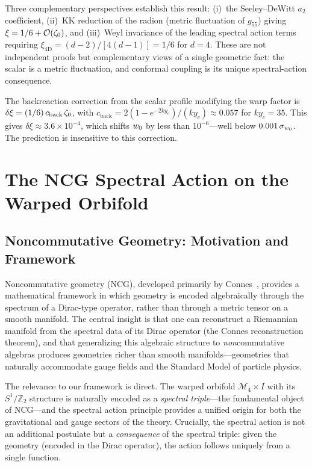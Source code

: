 Three complementary perspectives establish this result: (i)~the Seeley--DeWitt $a_2$ coefficient, (ii)~KK reduction of the radion (metric fluctuation of $g_{55}$) giving $\xi = 1/6 + \mathcal{O}\!\left(\zeta_0\right)$, and (iii)~Weyl invariance of the leading spectral action terms requiring $\xi_{4\mathrm{D}} = (d-2)/[4(d-1)] = 1/6$ for $d = 4$. These are not independent proofs but complementary views of a single geometric fact: the scalar is a metric fluctuation, and conformal coupling is its unique spectral-action consequence.

The backreaction correction from the scalar profile modifying the warp factor is $\delta\xi = (1/6)\, c_{\mathrm{back}}\,\zeta_0$, with $c_{\mathrm{back}} = 2(1 - e^{-2ky_c})/(ky_c) \approx 0.057$ for $ky_c = 35$. This gives $\delta\xi \approx 3.6 \times 10^{-4}$, which shifts $w_0$ by less than $10^{-6}$---well below $0.001\,\sigma_{w_0}$. The prediction is insensitive to this correction.


\section{The NCG Spectral Action on the Warped Orbifold}
\label{sec:1-ncg}

\subsection{Noncommutative Geometry: Motivation and Framework}
\label{sec:1-ncg-motivation}

Noncommutative geometry (NCG), developed primarily by Connes~\cite{ch1:connes94}, provides a mathematical framework in which geometry is encoded algebraically through the spectrum of a Dirac-type operator, rather than through a metric tensor on a smooth manifold. The central insight is that one can reconstruct a Riemannian manifold from the spectral data of its Dirac operator (the Connes reconstruction theorem), and that generalizing this algebraic structure to \emph{non}commutative algebras produces geometries richer than smooth manifolds---geometries that naturally accommodate gauge fields and the Standard Model of particle physics.

The relevance to our framework is direct. The warped orbifold $\mathcal{M}_4 \times I$ with its $S^1/\mathbb{Z}_2$ structure is naturally encoded as a \emph{spectral triple}---the fundamental object of NCG---and the spectral action principle provides a unified origin for both the gravitational and gauge sectors of the theory. Crucially, the spectral action is not an additional postulate but a \emph{consequence} of the spectral triple: given the geometry (encoded in the Dirac operator), the action follows uniquely from a single function.

